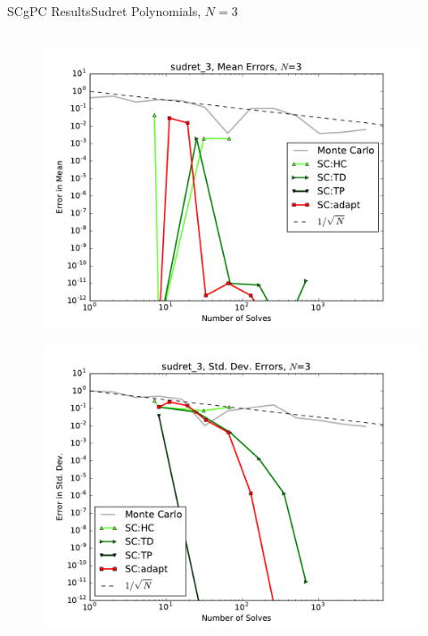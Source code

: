 \documentclass{beamer}
\begin{document}
\begin{frame}{SCgPC Results}{Sudret Polynomials, $N=3$}
\begin{columns}
\begin{column}{0.5\textwidth}
\begin{figure}[h!]
          \includegraphics[width=0.8\linewidth]{anlmodels/sudret_3_mean_errs_nohdmr}
        \end{figure}
        \vspace{-20pt}
        \begin{figure}[h!]
          \centering
          \includegraphics[width=0.8\linewidth]{anlmodels/sudret_3_variance_errs_nohdmr}
        \end{figure}
   \end{column}
 \end{columns}
\end{frame}
\end{document}
